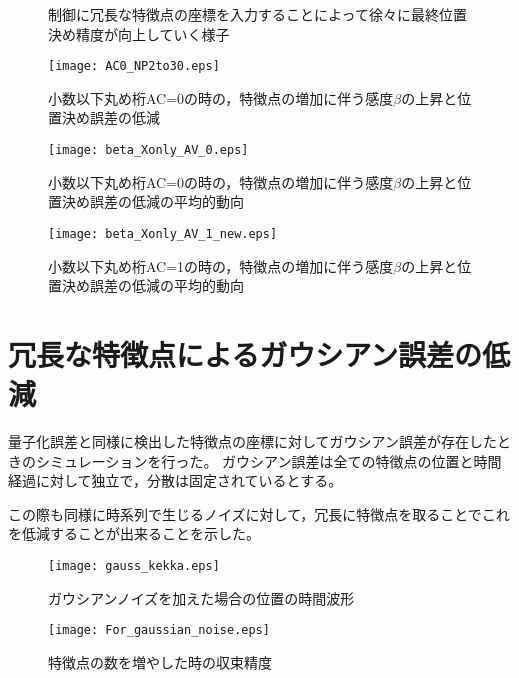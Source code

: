 \documentclass[fleqn]{jreport}
\begin{document}
\begin{figure}[!p]
	\centering
	\caption{制御に冗長な特徴点の座標を入力することによって徐々に最終位置決め精度が向上していく様子}
	\label{fig:hikaku2}
\end{figure}


\begin{figure}[t]
	\centering
	\texttt{[image: AC0\_NP2to30.eps]}\label{fig:AC0_NP2to30}
	\caption{小数以下丸め桁AC=0の時の，特徴点の増加に伴う感度$\beta$の上昇と位置決め誤差の低減}
\end{figure}

\begin{figure}[t]
	\centering
	\texttt{[image: beta\_Xonly\_AV\_0.eps]}\label{fig:beta_Xonly_AV_0}
	\caption{小数以下丸め桁AC=0の時の，特徴点の増加に伴う感度$\beta$の上昇と位置決め誤差の低減の平均的動向}
	\texttt{[image: beta\_Xonly\_AV\_1\_new.eps]}\label{fig:beta_Xonly_AV_1_new}
	\caption{小数以下丸め桁AC=1の時の，特徴点の増加に伴う感度$\beta$の上昇と位置決め誤差の低減の平均的動向}
\end{figure}	



\section{冗長な特徴点によるガウシアン誤差の低減}
量子化誤差と同様に検出した特徴点の座標に対してガウシアン誤差が存在したときのシミュレーションを行った。
ガウシアン誤差は全ての特徴点の位置と時間経過に対して独立で，分散は固定されているとする。

この際も同様に時系列で生じるノイズに対して，冗長に特徴点を取ることでこれを低減することが出来ることを示した。
\begin{figure}[!t]
	\centering
	\texttt{[image: gauss\_kekka.eps]}
	\caption{ガウシアンノイズを加えた場合の位置の時間波形}
	\texttt{[image: For\_gaussian\_noise.eps]}
	\caption{特徴点の数を増やした時の収束精度}
\end{figure}
\end{document}
